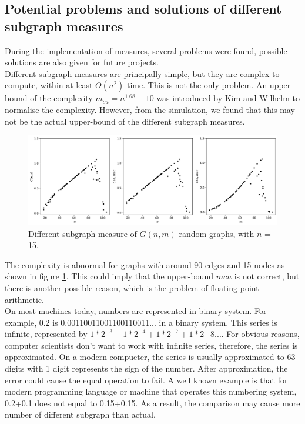 \documentclass[12pt]{article}
\begin{document}
\subsection{Potential problems and solutions of different subgraph measures}
During the implementation of measures, several problems were found, possible solutions are also given for future projects.\\
Different subgraph measures are principally simple, but they are complex to compute, within at least $O(n^2)$ time\cite{KIM20082637}. This is not the only problem. An upper-bound of the complexity $m_{cu} = n^{1.68}-10$ was introduced by Kim and Wilhelm\cite{KIM20082637} to normalise the complexity. However, from the simulation, we found that this may not be the actual upper-bound of the different subgraph measures.

\begin{figure}[ht]
    \includegraphics[width=\textwidth]{subgraph_measures.png}
    \caption{Different subgraph measure of $G(n,m)$ random graphs, with $n$ = 15.}
    \label{fig:subgraph_measure}
\end{figure}
\noindent
The complexity is abnormal for graphs with around 90 edges and 15 nodes as shown in figure \ref{fig:subgraph_measure}. This could imply that the upper-bound $mcu$ is not correct, but there is another possible reason, which is the problem of floating point arithmetic.\\
On most machines today, numbers are represented in binary system\cite{floating_point}. For example, 0.2 is 0.00110011001100110011... in a binary system. This series is infinite, represented by $1*2^{-3}+1*2^{-4}+1*2^{-7}+1*2{-8}...$. For obvious reasons, computer scientists don't want to work with infinite series, therefore, the series is approximated. On a modern compueter, the series is usually approximated to 63 digits with 1 digit represents the sign of the number. After approximation, the error could cause the equal operation to fail. A well known example is that for modern programming language or machine that operates this numbering system, 0.2+0.1 does not equal to 0.15+0.15. As a result, the comparison may cause more number of different subgraph than actual.\\
\end{document}
